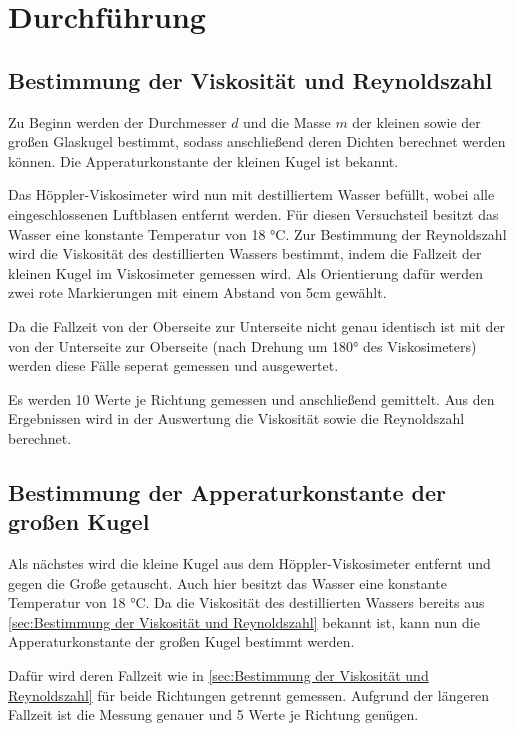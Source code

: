 \section{Durchführung}
\label{sec:Durchführung}

\subsection{Bestimmung der Viskosität und Reynoldszahl}
\label{sec:Bestimmung der Viskosität und Reynoldszahl}

Zu Beginn werden der Durchmesser $d$ und die Masse $m$ der kleinen sowie der großen Glaskugel bestimmt,
sodass anschließend deren Dichten berechnet werden können. Die Apperaturkonstante der kleinen Kugel ist bekannt.

Das Höppler-Viskosimeter wird nun mit destilliertem Wasser befüllt, wobei alle eingeschlossenen Luftblasen entfernt werden.
Für diesen Versuchsteil besitzt das Wasser eine konstante Temperatur von 18 °C.
Zur Bestimmung der Reynoldszahl wird die Viskosität des destillierten Wassers bestimmt, indem
die Fallzeit der kleinen Kugel im Viskosimeter gemessen wird. Als Orientierung dafür werden zwei rote 
Markierungen mit einem Abstand von 5cm gewählt.

Da die Fallzeit von der Oberseite zur Unterseite nicht genau identisch ist mit der von der Unterseite zur Oberseite
(nach Drehung um 180° des Viskosimeters) werden diese Fälle seperat gemessen und ausgewertet.

Es werden 10 Werte je Richtung gemessen und anschließend gemittelt. Aus den Ergebnissen wird in der Auswertung die Viskosität
sowie die Reynoldszahl berechnet.

\subsection{Bestimmung der Apperaturkonstante der großen Kugel}
\label{sec:Bestimmung der Apperaturkonstante der großen Kugel}
Als nächstes wird die kleine Kugel aus dem Höppler-Viskosimeter entfernt und gegen die Große getauscht.
Auch hier besitzt das Wasser eine konstante Temperatur von 18 °C.
Da die Viskosität des destillierten Wassers bereits aus \autoref{sec:Bestimmung der Viskosität und Reynoldszahl} bekannt ist,
kann nun die Apperaturkonstante der großen Kugel bestimmt werden.

Dafür wird deren Fallzeit wie in \autoref{sec:Bestimmung der Viskosität und Reynoldszahl} für beide Richtungen getrennt gemessen.
Aufgrund der längeren Fallzeit ist die Messung genauer und 5 Werte je Richtung genügen.

